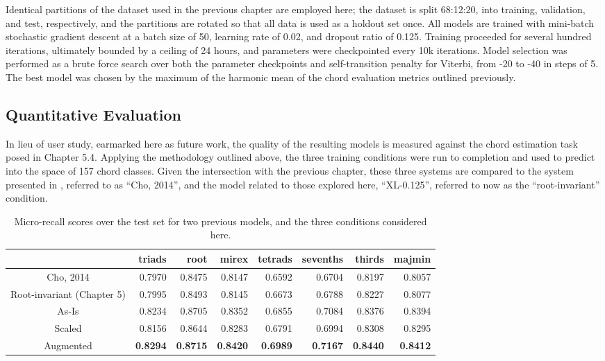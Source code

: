 Identical partitions of the dataset used in the previous chapter are employed here; the dataset is split 68:12:20, into training, validation, and test, respectively, and the partitions are rotated so that all data is used as a holdout set once.
All models are trained with mini-batch stochastic gradient descent at a batch size of 50, learning rate of 0.02, and dropout ratio of 0.125.
Training proceeded for several hundred iterations, ultimately bounded by a ceiling of 24 hours, and parameters were checkpointed every 10k iterations.
Model selection was performed as a brute force search over both the parameter checkpoints and self-transition penalty for Viterbi, from -20 to -40 in steps of 5.
The best model was chosen by the maximum of the harmonic mean of the chord evaluation metrics outlined previously.


\subsection{Quantitative Evaluation}
\label{subsec:evaluation}

In lieu of user study, earmarked here as future work, the quality of the resulting models is measured against the chord estimation task posed in Chapter 5.4.
Applying the methodology outlined above, the three training conditions were run to completion and used to predict into the space of 157 chord classes.
Given the intersection with the previous chapter, these three systems are compared to the system presented in \cite{Cho2014}, referred to as ``Cho, 2014'', and the model related to those explored here, ``XL-0.125'', referred to now as the ``root-invariant'' condition.

\begin{table}[t]
\begin{center}
\scriptsize
\caption{Micro-recall scores over the test set for two previous models, and the three conditions considered here.}
\label{tab:test_micro}
\begin{tabular}{c|rrrrrrr}

\hline
 & triads &   root &   mirex &   tetrads &   sevenths &   thirds &   majmin \\
\hline
Cho, 2014 & 0.7970 & 0.8475 & 0.8147 & 0.6592 & 0.6704 & 0.8197 & 0.8057 \\
\hline
Root-invariant (Chapter 5)  & 0.7995 & 0.8493 & 0.8145 & 0.6673 & 0.6788 & 0.8227 & 0.8077 \\
\hline
As-Is     & 0.8234 & 0.8705 & 0.8352 & 0.6855 & 0.7084 & 0.8376 & 0.8394 \\
Scaled    & 0.8156 & 0.8644 & 0.8283 & 0.6791 & 0.6994 & 0.8308 & 0.8295 \\
Augmented & \textbf{0.8294} & \textbf{0.8715} & \textbf{0.8420} & \textbf{0.6989} & \textbf{0.7167} & \textbf{0.8440} & \textbf{0.8412} \\
\hline
\end{tabular}
\end{center}
\end{table}

